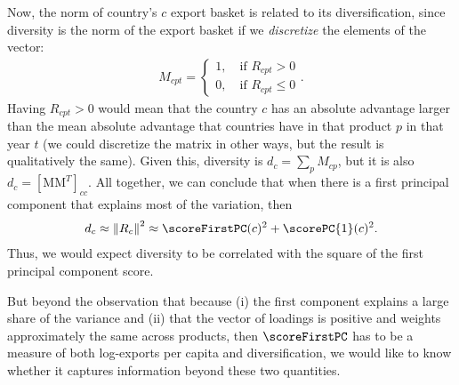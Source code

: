 Now, the norm of country's $c$ export basket is related to its diversification, since diversity is the norm of the export basket if we \emph{discretize} the elements of the vector: 
\begin{align*}
	M_{cpt}=
	\begin{cases}
		1,\quad\text{if $R_{cpt}>0$}\\
		0,\quad\text{if $R_{cpt}\leq 0$}
	\end{cases}.
\end{align*}
Having $R_{cpt}>0$ would mean that the country $c$ has an absolute advantage larger than the mean absolute advantage that countries have in that product $p$ in that year $t$ (we could discretize the matrix in other ways, but the result is qualitatively the same). Given this, diversity is $d_{c} = \sum_p M_{cp}$, but it is also $d_c = [\mathrm{M}\mathrm{M}^T]_{cc}$. All together, we can conclude that when there is a first principal component that explains most of the variation, then
\begin{align*}
	d_c \approx \left\|R_c\right\|^2\approx \scoreFirstPC(c)^2 + \scorePC{1}(c)^2.
\end{align*}
Thus, we would expect diversity to be correlated with the square of the first principal component score.

But beyond the observation that because (i) the first component explains a large share of the variance and (ii) that the vector of loadings is positive and weights approximately the same across products, then $\scoreFirstPC$ has to be a measure of both log-exports per capita and diversification, we would like to know whether it captures information beyond these two quantities. 

